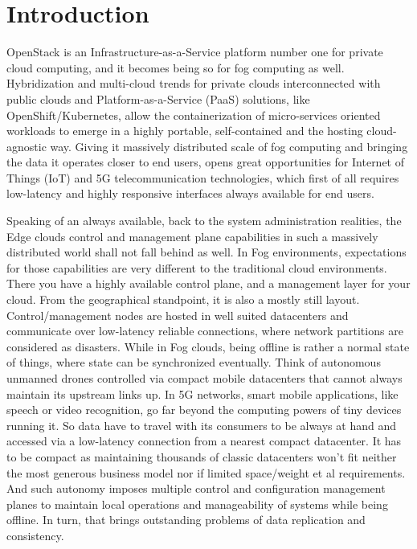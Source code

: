 \documentclass[conference]{IEEEtran}
\begin{document}
\section{Introduction}

OpenStack is an Infrastructure-as-a-Service platform number one for private
cloud computing, and it becomes being so for fog computing as well.
Hybridization and multi-cloud trends for private clouds interconnected with
public clouds and Platform-as-a-Service (PaaS) solutions, like
OpenShift/Kubernetes, allow the containerization of micro-services oriented
workloads to emerge in a highly portable, self-contained and the hosting
cloud-agnostic way. Giving it massively distributed scale of fog computing and
bringing the data it operates closer to end users, opens great opportunities
for Internet of Things (IoT) and 5G telecommunication technologies,
which first of all requires low-latency and highly responsive interfaces always
available for end users.

Speaking of an always available, back to the system administration realities,
the Edge clouds control and management plane capabilities in such a massively
distributed world shall not fall behind as well. In Fog environments,
expectations for those capabilities are very different to the traditional cloud
environments. There you have a highly available control plane, and a management
layer for your cloud. From the geographical standpoint, it is also a mostly
still layout. Control/management nodes are hosted in well suited datacenters
and communicate over low-latency reliable connections, where network partitions
are considered as disasters. While in Fog clouds, being offline is rather a
normal state of things, where state can be synchronized eventually. Think of
autonomous unmanned drones controlled via compact mobile datacenters that
cannot always maintain its upstream links up. In 5G networks, smart mobile
applications, like speech or video recognition, go far beyond the computing
powers of tiny devices running it. So data have to travel with its consumers to
be always at hand and accessed via a low-latency connection from a nearest
compact datacenter. It has to be compact as maintaining thousands of classic
datacenters won't fit neither the most generous business model nor if limited
space/weight et al requirements. And such autonomy imposes multiple control and
configuration management planes to maintain local operations and manageability
of systems while being offline. In turn, that brings outstanding problems of
data replication and consistency.
\end{document}

